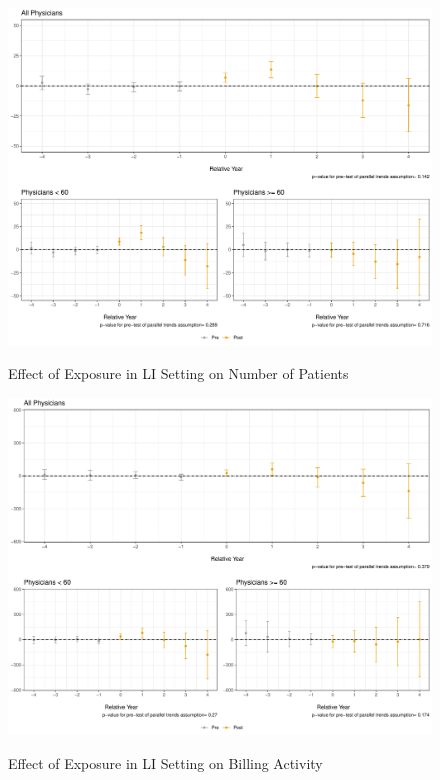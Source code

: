 \documentclass[11pt]{article}
\begin{document}
\begin{figure}[p]
    \centering
    \caption{Effect of Exposure in LI Setting on Number of Patients}
    \includegraphics[scale=.4]{Objects/patient_plot_LI.pdf}
    \label{fig:patient_LI}
\end{figure}

\begin{figure}[p]
    \centering
    \caption{Effect of Exposure in LI Setting on Billing Activity}
    \includegraphics[scale=.4]{Objects/claim_plot_LI.pdf}
    \label{fig:claim_LI}
\end{figure}
\end{document}

